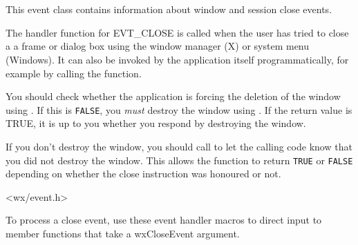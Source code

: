 \section{}\label{wxcloseevent}

This event class contains information about window and session close events.

The handler function for EVT\_CLOSE is called when the user has tried to close a a frame
or dialog box using the window manager (X) or system menu (Windows). It can
also be invoked by the application itself programmatically, for example by
calling the  function.

You should check whether the application is forcing the deletion of the window
using . If this is {\tt FALSE},
you {\it must} destroy the window using .
If the return value is TRUE, it is up to you whether you respond by destroying the window.

If you don't destroy the window, you should call  to
let the calling code know that you did not destroy the window. This allows the  function
to return {\tt TRUE} or {\tt FALSE} depending on whether the close instruction was honoured or not.




<wx/event.h>


To process a close event, use these event handler macros to direct input to member
functions that take a wxCloseEvent argument.

\twocolwidtha{7cm}
\begin{twocollist}\itemsep=0pt
\end{twocollist}%


